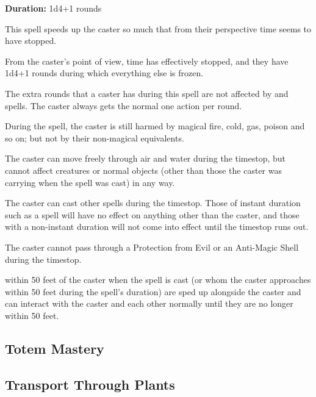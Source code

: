 \begin{multicols*}{2}
{\textbf{Duration:} 1d4+1 rounds}

This spell speeds up the caster so much that from their perspective time seems to have stopped.

From the caster’s point of view, time has effectively stopped, and they have 1d4+1 rounds during which everything else is frozen.

The extra rounds that a caster has during this spell are not affected by  and  spells. The caster always gets the normal one action per round.

During the spell, the caster is still harmed by magical fire, cold, gas, poison and so on; but not by their non-magical equivalents.

The caster can move freely through air and water during the timestop, but cannot affect creatures or normal objects (other than those the caster was carrying when the spell was cast) in any way.

The caster can cast other spells during the timestop. Those of instant duration such as a  spell will have no effect on anything other than the caster, and those with a non-instant duration will not come into effect until the timestop runs out.

The caster cannot pass through a Protection from Evil or an Anti-Magic Shell during the timestop.

 within 50 feet of the caster when the spell is cast (or whom the caster approaches within 50 feet during the spell’s duration) are sped up alongside the caster and can interact with the caster and each other normally until they are no longer within 50 feet.

\subsection{Totem Mastery}\label{spell:Totem Mastery}


\subsection{Transport Through Plants}\label{spell:Transport Through Plants}
\end{multicols*}
